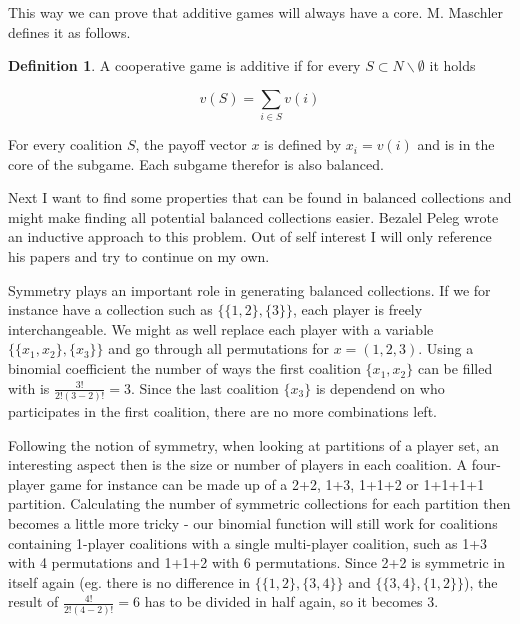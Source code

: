 \documentclass[10pt,a4paper,titlepage]{article}
\theoremstyle{plain}
\theoremstyle{definition}
\newtheorem{definition}[thm]{Definition} %
\begin{document}
This way we can prove that additive games will always have a core. M. Maschler\cite{maschler} defines it as follows.

\begin{definition}
    A cooperative game is additive if for every $S \subset N \backslash \emptyset$ it holds

    \begin{equation}
        v(S) = \sum_{i \in S}v(i)
    \end{equation}
\end{definition}

For every coalition $S$, the payoff vector $x$ is defined by $x_i = v(i)$ and is in the core of the subgame. Each subgame therefor is also balanced.\vspace{8pt}

Next I want to find some properties that can be found in balanced collections and might make finding all potential balanced collections easier. Bezalel Peleg\cite{peleg} wrote an inductive approach to this problem. Out of self interest I will only reference his papers and try to continue on my own.

Symmetry plays an important role in generating balanced collections. If we for instance have a collection such as $\{\{1, 2\}, \{3\}\}$, each player is freely interchangeable. We might as well replace each player with a variable $\{\{x_1, x_2\}, \{x_3\}\}$ and go through all permutations for $x = (1, 2, 3)$. Using a binomial coefficient the number of ways the first coalition $\{x_1, x_2\}$ can be filled with is $\frac{3!}{2!(3-2)!} = 3$. Since the last coalition $\{x_3\}$ is dependend on who participates in the first coalition, there are no more combinations left.\vspace{8pt}

Following the notion of symmetry, when looking at partitions of a player set, an interesting aspect then is the size or number of players in each coalition. A four-player game for instance can be made up of a 2+2, 1+3, 1+1+2 or 1+1+1+1 partition. Calculating the number of symmetric collections for each partition then becomes a little more tricky - our binomial function will still work for coalitions containing 1-player coalitions with a single multi-player coalition, such as 1+3 with 4 permutations and 1+1+2 with 6 permutations. Since 2+2 is symmetric in itself again (eg. there is no difference in $\{\{1, 2\}, \{3, 4\}\}$ and $\{\{3, 4\}, \{1, 2\}\}$), the result of $\frac{4!}{2!(4-2)!} = 6$ has to be divided in half again, so it becomes $3$.
\end{document}
